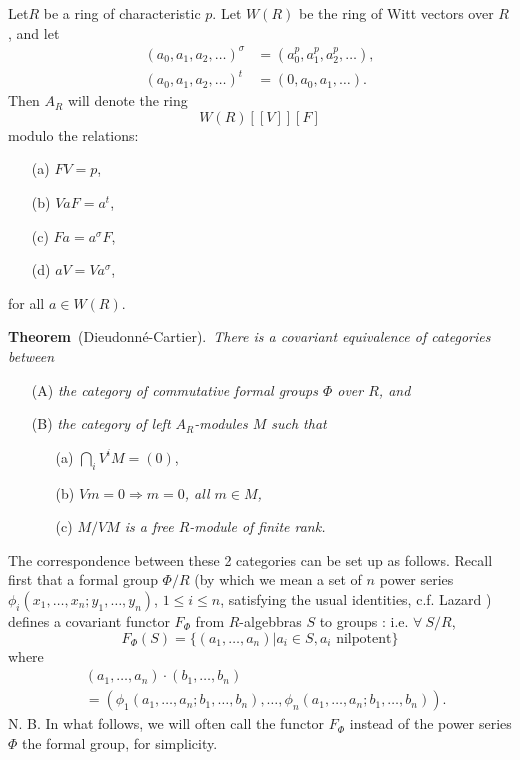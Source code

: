 \begin{defi*}
Let\pageoriginale $R$ be a ring of characteristic $p$. Let $W(R)$ be the ring of Witt vectors over $R$, and let
\begin{align*}
(a_{0},a_{1},a_{2},\ldots)^{\sigma} &= (a^{p}_{0},a^{p}_{1},a^{p}_{2},\ldots),\\[3pt]
(a_{0},a_{1},a_{2},\ldots)^{t} &= (0,a_{0},a_{1},\ldots). 
\end{align*}
Then $A_{R}$ will denote the ring
$$
W(R)[[V]][F]
$$
modulo the relations:
\begin{itemize}
\item[{\rm(a)}] $FV=p$,

\item[{\rm(b)}] $VaF=a^{t}$,

\item[{\rm(c)}] $Fa=a^{\sigma}F$,

\item[{\rm(d)}] $aV=Va^{\sigma}$,
\end{itemize}
for all $a\in W(R)$.
\end{defi*}

\noindent
{\bf Theorem}~(Dieudonn\'e-Cartier).~{\em There is a covariant equivalence of categories between}
\begin{itemize}
\item[{\rm(A)}] {\em the category of commutative formal groups $\Phi$ over $R$, and}

\item[{\rm(B)}] {\em the category of left $A_{R}$-modules $M$ such that}
\begin{itemize}
\item[{\rm(a)}] $\bigcap\limits_{i}V^{i}M=(0)$,

\item[{\rm(b)}] {\em $Vm=0\Rightarrow m=0$, all $m\in M$,}

\item[{\rm(c)}] {\em $M/VM$ is a free $R$-module of finite rank.}
\end{itemize}
\end{itemize}

The correspondence between these 2 categories can be set up as follows. Recall first that a formal group $\Phi/R$ (by which we mean a set of $n$ power series $\phi_{i}(x_{1},\ldots,x_{n};y_{1},\ldots,y_{n})$, $1\leq i\leq n$, satisfying the usual identities, c.f. Lazard \cite{art15-key3}) defines a covariant functor $F_{\Phi}$ from $R$-algebbras $S$ to groups : i.e. $\forall \ S/R$,
$$
F_{\Phi}(S)=\{(a_{1},\ldots,a_{n})|a_{i}\in S, a_{i}\text{~nilpotent}\}
$$
where
\begin{align*}
&(a_{1},\ldots,a_{n})\cdot (b_{1},\ldots,b_{n})\\
&=(\phi_{1}(a_{1},\ldots,a_{n};b_{1},\ldots,b_{n}),\ldots,\phi_{n}(a_{1},\ldots,a_{n};b_{1},\ldots,b_{n})).
\end{align*}
N. B. In what follows, we will often call the functor $F_{\Phi}$ instead of the power series $\Phi$ the formal group, for simplicity.

